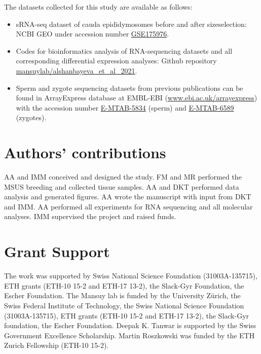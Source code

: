 \documentclass[12pt,twoside]{reedthesis}
\begin{document}
The datasets collected for this study are available as follows:
\begin{itemize}
\item
  sRNA-seq dataset of cauda epididymosomes before and after
  sizeselection: NCBI GEO under accession number
  \href{https://www.ncbi.nlm.nih.gov/geo/query/acc.cgi?acc=GSE175976}{GSE175976}.
\item
  Codes for bioinformatics analysis of RNA-sequencing datasets and all
  corresponding differential expression analyses: Github repository
  \href{https://github.com/mansuylab/alshanbayeva_et_al_2021}{mansuylab/alshanbayeva\_et\_al\_2021}.
\item
  Sperm and zygote sequencing datasets from previous publications can
  be found in ArrayExpress database at EMBL-EBI
  (\url{www.ebi.ac.uk/arrayexpress}) with the
  accession number
  \href{https://www.ebi.ac.uk/arrayexpress/experiments/E-MTAB-5834/}{E-MTAB-5834}
  (sperm) and
  \href{https://www.ebi.ac.uk/arrayexpress/experiments/E-MTAB-6589/}{E-MTAB-6589}
  (zygotes).
\end{itemize}
\hypertarget{authors-contributions}{%
\section{Authors' contributions}\label{authors-contributions}}

AA and IMM conceived and designed the study. FM and MR performed the
MSUS breeding and collected tissue samples. AA and DKT performed data
analysis and generated figures. AA wrote the manuscript with input from
DKT and IMM. AA performed all experiments for RNA sequencing and all
molecular analyses. IMM supervised the project and raised funds.

\hypertarget{grant-support}{%
\section{Grant Support}\label{grant-support}}

The work was supported by Swiss National Science Foundation
(31003A-135715), ETH grants (ETH-10 15-2 and ETH-17 13-2), the Slack-Gyr
Foundation, the Escher Foundation. The Mansuy lab is funded by the
University Zürich, the Swiss Federal Institute of Technology, the Swiss
National Science Foundation (31003A-135715), ETH grants (ETH-10 15-2 and
ETH-17 13-2), the Slack-Gyr foundation, the Escher Foundation. Deepak K.
Tanwar is supported by the Swiss Government Excellence Scholarship.
Martin Roszkowski was funded by the ETH Zurich Fellowship (ETH-10 15-2).
\end{document}
